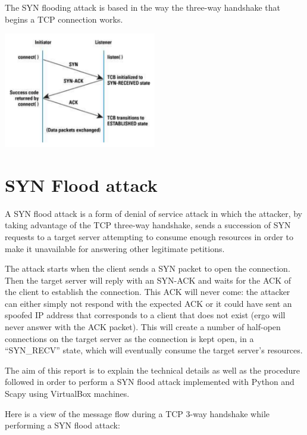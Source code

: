 \documentclass[11pt]{article}
\begin{document}
The SYN flooding attack is based in the way the three-way handshake that begins a TCP connection works.

\begin{center}
\vfill\vfill
\includegraphics[width=0.5\textwidth]{3wayhandshake.png}\\[1cm]
\end{center}

\section{SYN Flood attack}
A SYN flood attack is a form of denial of service attack in which the attacker, by taking advantage of the TCP three-way handshake, sends a succession of SYN requests to a target server attempting to consume enough resources in order to make it unavailable for answering other legitimate petitions.\vspace{5mm}

The attack starts when the client sends a SYN packet to open the connection. Then the target server will reply with an SYN-ACK and waits for the ACK of the client to establish the connection. This ACK will never come: the attacker can either simply not respond with the expected ACK or it could have sent an spoofed IP address that corresponds to a client that does not exist (ergo will never answer with the ACK packet). This will create a number of half-open connections on the target server as the connection is kept open, in a “SYN\_RECV” state, which will eventually consume the target server's resources.\vspace{5mm}

The aim of this report is to explain the technical details as well as the procedure followed in order to perform a SYN flood attack implemented with Python and Scapy using VirtualBox machines.\vspace{5mm}

Here is a view of the message flow during a TCP 3-way handshake while performing a SYN flood attack:
\end{document}
